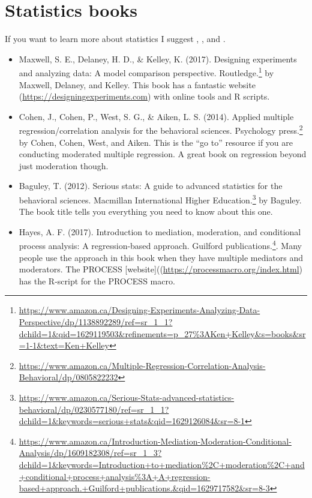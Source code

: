 \documentclass[
]{krantz}
\renewcommand{\href}[2]{#2\footnote{\url{#1}}}
\begin{document}
\hypertarget{statistics-books}{%
\section{Statistics books}\label{statistics-books}}

If you want to learn more about statistics I suggest \citep{maxwell2017designing}, \citep{cohen2014applied}, and \citep{baguley2012serious}.

\begin{itemize}
\item
  \href{https://www.amazon.ca/Designing-Experiments-Analyzing-Data-Perspective/dp/1138892289/ref=sr_1_1?dchild=1\&qid=1629119503\&refinements=p_27\%3AKen+Kelley\&s=books\&sr=1-1\&text=Ken+Kelley}{Maxwell, S. E., Delaney, H. D., \& Kelley, K. (2017). Designing experiments and analyzing data: A model comparison perspective. Routledge.} by Maxwell, Delaney, and Kelley. This book has a fantastic website (\url{https://designingexperiments.com}) with online tools and R scripts.
\item
  \href{https://www.amazon.ca/Multiple-Regression-Correlation-Analysis-Behavioral/dp/0805822232}{Cohen, J., Cohen, P., West, S. G., \& Aiken, L. S. (2014). Applied multiple regression/correlation analysis for the behavioral sciences. Psychology press.} by Cohen, Cohen, West, and Aiken. This is the ``go to'' resource if you are conducting moderated multiple regression. A great book on regression beyond just moderation though.
\item
  \href{https://www.amazon.ca/Serious-Stats-advanced-statistics-behavioral/dp/0230577180/ref=sr_1_1?dchild=1\&keywords=serious+stats\&qid=1629126084\&sr=8-1}{Baguley, T. (2012). Serious stats: A guide to advanced statistics for the behavioral sciences. Macmillan International Higher Education.} by Baguley. The book title tells you everything you need to know about this one.
\item
  \href{https://www.amazon.ca/Introduction-Mediation-Moderation-Conditional-Analysis/dp/1609182308/ref=sr_1_3?dchild=1\&keywords=Introduction+to+mediation\%2C+moderation\%2C+and+conditional+process+analysis\%3A+A+regression-based+approach.+Guilford+publications.\&qid=1629717582\&sr=8-3}{Hayes, A. F. (2017). Introduction to mediation, moderation, and conditional process analysis: A regression-based approach. Guilford publications.}. Many people use the approach in this book when they have multiple mediators and moderators. The PROCESS {[}website{]}((\url{https://processmacro.org/index.html}) has the R-script for the PROCESS macro.
\end{itemize}
\end{document}
